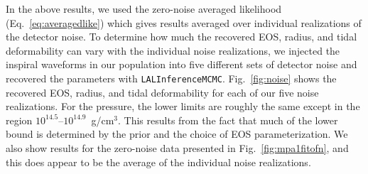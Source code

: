 \documentclass[twocolumn,prd,amssymb,aps,nofootinbib,showpacs,epsf]{revtex4}
\begin{document}
In the above results, we used the zero-noise averaged likelihood (Eq.~\eqref{eq:averagedlike}) which gives results averaged over individual realizations of the detector noise. To determine how much the recovered EOS, radius, and tidal deformability can vary with the individual noise realizations, we injected the inspiral waveforms in our population into five different sets of detector noise and recovered the parameters with \texttt{LALInferenceMCMC}. Fig.~\ref{fig:noise} shows the recovered EOS, radius, and tidal deformability for each of our five noise realizations. For the pressure, the lower limits are roughly the same except in the region $10^{14.5}$--$10^{14.9}$~g/cm$^3$. This results from the fact that much of the lower bound is determined by the prior and the choice of EOS parameterization. We also show results for the zero-noise data presented in Fig.~\ref{fig:mpa1fitofn}, and this does appear to be the average of the individual noise realizations.
\end{document}
